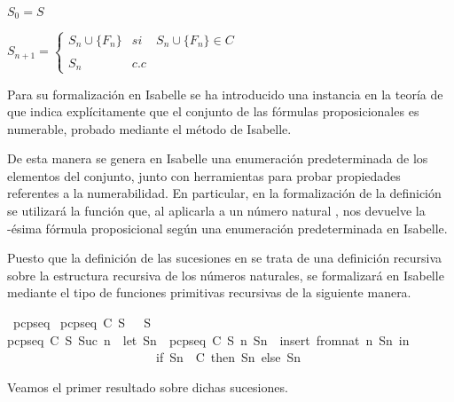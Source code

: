 \begin{isabellebody}
\begin{isamarkuptext}
\begin{definicion}
  $S_{0} = S$

  $S_{n+1} = \left\{ \begin{array}{lcc} S_{n} \cup \{F_{n}\} &  si  & S_{n} \cup \{F_{n}\} \in C \\ \\ S_{n} & c.c \end{array} \right.$ 
\end{definicion}

  Para su formalización en Isabelle se ha introducido una instancia en la teoría de  que 
  indica explícitamente que el conjunto de las fórmulas proposicionales es numerable, probado
  mediante el método  de Isabelle.


  De esta manera se genera en Isabelle una enumeración predeterminada de los elementos del conjunto,
  junto con herramientas para probar propiedades referentes a la numerabilidad. En particular, en la 
  formalización de la definición  se utilizará la función  que, al aplicarla a un 
  número natural , nos devuelve la -ésima fórmula proposicional según una enumeración 
  predeterminada en Isabelle. 

  Puesto que la definición de las sucesiones en  se trata de una definición 
  recursiva sobre la estructura recursiva de los números naturales, se formalizará en Isabelle
  mediante el tipo de funciones primitivas recursivas de la siguiente manera.%
\end{isamarkuptext}\isamarkuptrue%
\isamarkupfalse%
\ pcp{\isacharunderscore}seq\ \isanewline
{\isachardoublequoteopen}pcp{\isacharunderscore}seq\ C\ S\ {}\ {\isacharequal}\ S{\isachardoublequoteclose}\ {\isacharbar}\isanewline
{\isachardoublequoteopen}pcp{\isacharunderscore}seq\ C\ S\ {\isacharparenleft}Suc\ n{\isacharparenright}\ {\isacharequal}\ {\isacharparenleft}let\ Sn\ {\isacharequal}\ pcp{\isacharunderscore}seq\ C\ S\ n{\isacharsemicolon}\ Sn{}\ {\isacharequal}\ insert\ {\isacharparenleft}from{\isacharunderscore}nat\ n{\isacharparenright}\ Sn\ in\isanewline
\ \ \ \ \ \ \ \ \ \ \ \ \ \ \ \ \ \ \ \ \ \ \ \ if\ Sn{}\ {\isasymin}\ C\ then\ Sn{}\ else\ Sn{\isacharparenright}{\isachardoublequoteclose}%
\begin{isamarkuptext}%
Veamos el primer resultado sobre dichas sucesiones.


\end{isamarkuptext}
\end{isabellebody}
